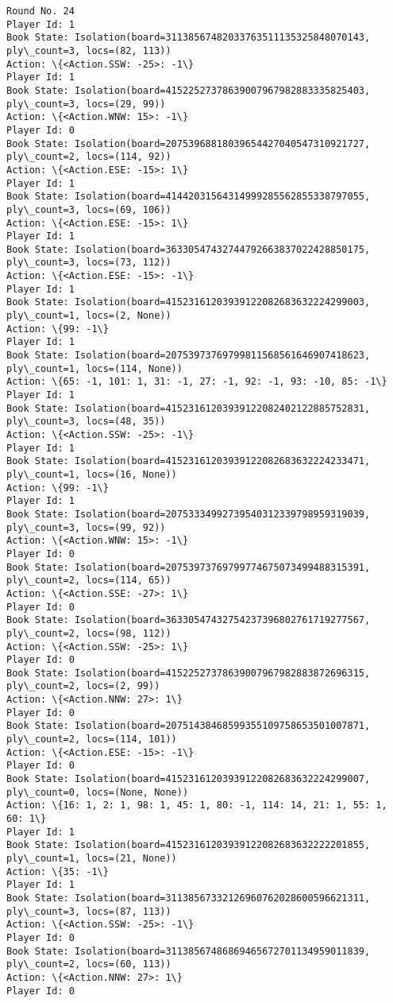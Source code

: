 \documentclass[11pt]{article}
\begin{document}
\begin{Verbatim}[commandchars=\\\{\}]
Round No. 24
Player Id: 1
Book State: Isolation(board=31138567482033763511135325848070143, ply\_count=3, locs=(82, 113))
Action: \{<Action.SSW: -25>: -1\}
Player Id: 1
Book State: Isolation(board=41522527378639007967982883335825403, ply\_count=3, locs=(29, 99))
Action: \{<Action.WNW: 15>: -1\}
Player Id: 0
Book State: Isolation(board=20753968818039654427040547310921727, ply\_count=2, locs=(114, 92))
Action: \{<Action.ESE: -15>: 1\}
Player Id: 1
Book State: Isolation(board=41442031564314999285562855338797055, ply\_count=3, locs=(69, 106))
Action: \{<Action.ESE: -15>: 1\}
Player Id: 1
Book State: Isolation(board=36330547432744792663837022428850175, ply\_count=3, locs=(73, 112))
Action: \{<Action.ESE: -15>: -1\}
Player Id: 1
Book State: Isolation(board=41523161203939122082683632224299003, ply\_count=1, locs=(2, None))
Action: \{99: -1\}
Player Id: 1
Book State: Isolation(board=20753973769799811568561646907418623, ply\_count=1, locs=(114, None))
Action: \{65: -1, 101: 1, 31: -1, 27: -1, 92: -1, 93: -10, 85: -1\}
Player Id: 1
Book State: Isolation(board=41523161203939122082402122885752831, ply\_count=3, locs=(48, 35))
Action: \{<Action.SSW: -25>: -1\}
Player Id: 1
Book State: Isolation(board=41523161203939122082683632224233471, ply\_count=1, locs=(16, None))
Action: \{99: -1\}
Player Id: 1
Book State: Isolation(board=20753334992739540312339798959319039, ply\_count=3, locs=(99, 92))
Action: \{<Action.WNW: 15>: -1\}
Player Id: 0
Book State: Isolation(board=20753973769799774675073499488315391, ply\_count=2, locs=(114, 65))
Action: \{<Action.SSE: -27>: 1\}
Player Id: 0
Book State: Isolation(board=36330547432754237396802761719277567, ply\_count=2, locs=(98, 112))
Action: \{<Action.SSW: -25>: 1\}
Player Id: 0
Book State: Isolation(board=41522527378639007967982883872696315, ply\_count=2, locs=(2, 99))
Action: \{<Action.NNW: 27>: 1\}
Player Id: 0
Book State: Isolation(board=20751438468599355109758653501007871, ply\_count=2, locs=(114, 101))
Action: \{<Action.ESE: -15>: -1\}
Player Id: 0
Book State: Isolation(board=41523161203939122082683632224299007, ply\_count=0, locs=(None, None))
Action: \{16: 1, 2: 1, 98: 1, 45: 1, 80: -1, 114: 14, 21: 1, 55: 1, 60: 1\}
Player Id: 1
Book State: Isolation(board=41523161203939122082683632222201855, ply\_count=1, locs=(21, None))
Action: \{35: -1\}
Player Id: 1
Book State: Isolation(board=31138567332126960762028600596621311, ply\_count=3, locs=(87, 113))
Action: \{<Action.SSW: -25>: -1\}
Player Id: 0
Book State: Isolation(board=31138567486869465672701134959011839, ply\_count=2, locs=(60, 113))
Action: \{<Action.NNW: 27>: 1\}
Player Id: 0

\end{Verbatim}
\end{document}
